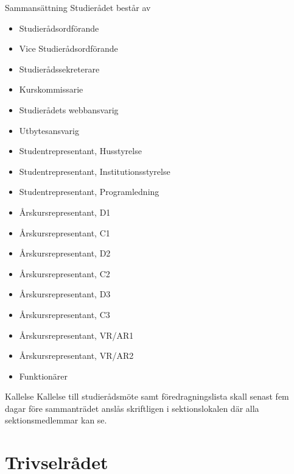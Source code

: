 \documentclass[pdfbookmarks,a4paper,11pt]{article}
\newlength{\itemcollength}
\newenvironment{reglemlista}{%
  \begin{list}{}{%
      \setlength{\labelwidth}{\itemcollength}%
      \setlength{\leftmargin}{\labelwidth + \labelsep}%
      \renewcommand{\makelabel}[1]{%
        \raisebox{0pt}[1ex][0pt]{%
          \makebox[\labelwidth][l]{%
            \parbox[t]{\itemcollength}{%
              \raggedright\hspace{0pt}##1}}}\hfill}%
      }}{%
  \end{list}}
\begin{document}
\begin{reglemlista}
		\item[Sammansättning]
	Studierådet består av
	\begin{itemize}
		\item Studierådsordförande
		\item Vice Studierådsordförande
		\item Studierådssekreterare
		\item Kurskommissarie
		\item Studierådets webbansvarig
		\item Utbytesansvarig
		\item Studentrepresentant, Husstyrelse
		\item Studentrepresentant, Institutionsstyrelse
		\item Studentrepresentant, Programledning
		\item Årskursrepresentant, D1
		\item Årskursrepresentant, C1
		\item Årskursrepresentant, D2
		\item Årskursrepresentant, C2
		\item Årskursrepresentant, D3
		\item Årskursrepresentant, C3
		\item Årskursrepresentant, VR/AR1
		\item Årskursrepresentant, VR/AR2
		\item Funktionärer
	\end{itemize}

	\item[Kallelse]
	Kallelse till studierådsmöte samt föredragningslista skall senast fem
	dagar före sammanträdet anslås skriftligen i sektionslokalen där alla sektionsmedlemmar kan se.

\end{reglemlista}

\section{Trivselrådet}
\end{document}
